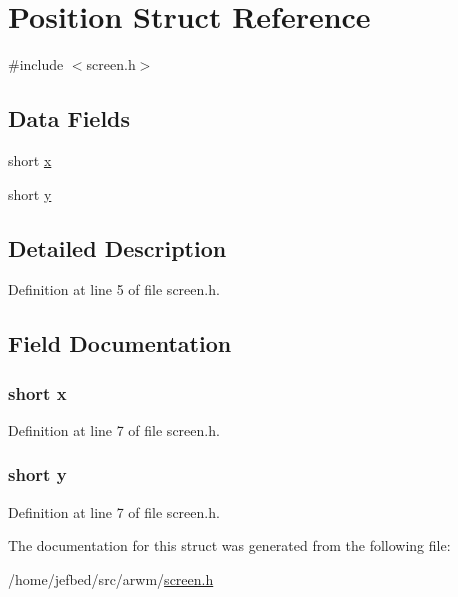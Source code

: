 \hypertarget{struct_position}{
\section{Position Struct Reference}
\label{struct_position}
}


{\ttfamily \#include $<$screen.h$>$}

\subsection*{Data Fields}
\begin{DoxyCompactItemize}
\item 
short \hyperlink{struct_position_ad34729e4edc23ac502eaa17b188df67b}{x}
\item 
short \hyperlink{struct_position_a34769302b056076dd9f0cd95de8c5d2f}{y}
\end{DoxyCompactItemize}


\subsection{Detailed Description}


Definition at line 5 of file screen.h.



\subsection{Field Documentation}
\hypertarget{struct_position_ad34729e4edc23ac502eaa17b188df67b}{
\subsubsection[{x}]{\setlength{\rightskip}{0pt plus 5cm}short {\bf x}}}
\label{struct_position_ad34729e4edc23ac502eaa17b188df67b}


Definition at line 7 of file screen.h.

\hypertarget{struct_position_a34769302b056076dd9f0cd95de8c5d2f}{
\subsubsection[{y}]{\setlength{\rightskip}{0pt plus 5cm}short {\bf y}}}
\label{struct_position_a34769302b056076dd9f0cd95de8c5d2f}


Definition at line 7 of file screen.h.



The documentation for this struct was generated from the following file:\begin{DoxyCompactItemize}
\item 
/home/jefbed/src/arwm/\hyperlink{screen_8h}{screen.h}\end{DoxyCompactItemize}
